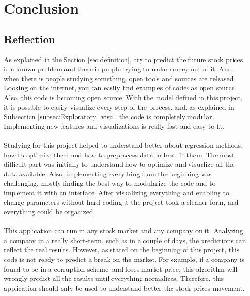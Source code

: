 \section{Conclusion}
\label{sec:conclusion}




\subsection{Reflection}
As explained in the Section \ref{sec:definition}, try to predict the future stock prices is a known problem and there is people trying to make money out of it. And, when there is people 
studying something, open tools and sources are released. Looking on the internet, you can easily find examples of codes as open source. Also, this code is becoming open source.
With the model defined in this project, it is possible to easily visualize every step of the process, and, as explained in Subsection \ref{subsec:Exploratory_visu}, the code is completely modular.
Implementing new features and visualizations is really fast and easy to fit.\\
\\
Studying for this project helped to understand better about regression methods, how to optimize them and how to preprocess data to best fit them. The most difficult part was initially to understand
how to optimize and visualize all the data available. Also, implementing everything from the beginning was challenging, mostly finding the best way to modularize the code and to implement it with 
an interface. After visualizing everything and enabling to change parameters without hard-coding it the project took a cleaner form, and everything could be organized.\\
\\
This application can run in any stock market and any company on it. Analyzing a company in a really short-term, such as in a couple of days, the predictions can reflect the real results. However, as stated on
the beginning of this project, this code is not ready to predict a break on the market. For example, if a company is found to be in a corruption scheme, and loses market price, this algorithm will 
wrongly predict all the results until everything normalizes. Therefore, this application should only be used to understand better the stock prices movement. 

